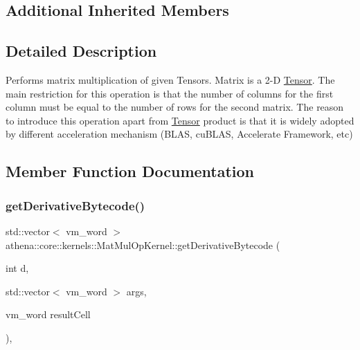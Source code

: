 \subsection*{Additional Inherited Members}


\subsection{Detailed Description}
Performs matrix multiplication of given Tensors. Matrix is a 2-\/D \mbox{\hyperlink{classathena_1_1core_1_1_tensor}{Tensor}}. The main restriction for this operation is that the number of columns for the first column must be equal to the number of rows for the second matrix. The reason to introduce this operation apart from \mbox{\hyperlink{classathena_1_1core_1_1_tensor}{Tensor}} product is that it is widely adopted by different acceleration mechanism (B\+L\+AS, cu\+B\+L\+AS, Accelerate Framework, etc) 

\subsection{Member Function Documentation}
\mbox{\label{classathena_1_1core_1_1kernels_1_1_mat_mul_op_kernel_a42d08b8004e8033e01988eb2392215c8}} 
\subsubsection{\texorpdfstring{get\+Derivative\+Bytecode()}{getDerivativeBytecode()}}
{\footnotesize\ttfamily std\+::vector$<$ vm\+\_\+word $>$ athena\+::core\+::kernels\+::\+Mat\+Mul\+Op\+Kernel\+::get\+Derivative\+Bytecode (\begin{DoxyParamCaption}\item[{int}]{d,  }\item[{std\+::vector$<$ vm\+\_\+word $>$}]{args,  }\item[{vm\+\_\+word}]{result\+Cell }\end{DoxyParamCaption})\hspace{0.3cm}{\ttfamily [override]}, {\ttfamily [virtual]}}


